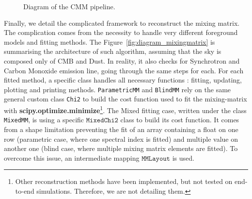 \documentclass[../../thesis.tex]{subfiles}
\begin{document}
\begin{figure}[htbp]
{%
}
\caption{Diagram of the CMM pipeline.}
\label{fig:diagram_cmm}
\end{figure}

Finally, we detail the complicated framework to reconstruct the mixing matrix. The complication comes from the necessity to handle very different foreground models and fitting methods. The Figure~\ref{fig:diagram_mixingmatrix} is summarising the architecture of such algorithm, assuming that the sky is composed only of CMB and Dust. In reality, it also checks for Synchrotron and Carbon Monoxide emission line, going through the same steps for each.
For each fitted method, a specific class handles all necessary functions : fitting, updating, plotting and printing methods. \texttt{ParametricMM} and \texttt{BlindMM} rely on the same general custom class \texttt{Chi2} to build the cost function used to fit the mixing-matrix with \textbf{scipy.optimize.minimize}\footnote{Other reconstruction methods have been implemented, but not tested on end-to-end simulations. Therefore, we are not detailing them.}. The Mixed fitting case, written under the class \texttt{MixedMM}, is using a specific $\texttt{MixedChi2}$ class to build its cost function. It comes from a shape limitation preventing the fit of an array containing a float on one row (parametric case, where one spectral index is fitted) and multiple value on another one (blind case, where multiple mixing matrix elements are fitted). To overcome this issue, an intermediate mapping $\texttt{MMLayout}$ is used.
\end{document}
